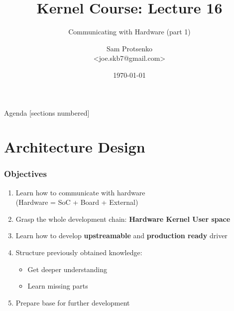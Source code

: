 

\title{Kernel Course: Lecture 16}
\subtitle{Communicating with Hardware (part 1)}
\author{Sam Protsenko \texorpdfstring{\\ <joe.skb7@gmail.com>}{}}
\date{\vspace*{5mm}\today}




\maketitle

\begin{frame}{Agenda}
  [sections numbered]
  \tableofcontents[hideallsubsections]
\end{frame}

\section{Architecture Design}

\begin{frame}
  \frametitle{Objectives}
  \begin{enumerate}
    \item Learn how to communicate with hardware \\
          (Hardware = SoC + Board + External)
    \item Grasp the whole development chain: \textbf{Hardware \textrightarrow{}
          Kernel \textrightarrow{} User space}
    \item Learn how to develop \textbf{upstreamable} and
          \textbf{production ready} driver
    \item Structure previously obtained knowledge:
    \begin{itemize}
      \item Get deeper understanding
      \item Learn missing parts
    \end{itemize}
    \item Prepare base for further development
  \end{enumerate}
\end{frame}

